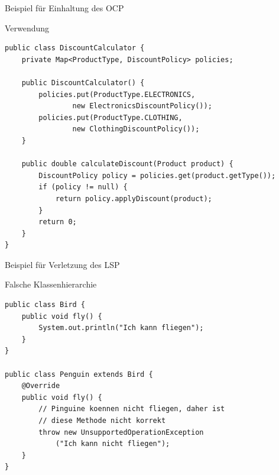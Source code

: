 \begin{frame}[fragile]{Beispiel für Einhaltung des OCP}
	\begin{exampleblock}{Verwendung}
        \begin{lstlisting}
public class DiscountCalculator {
    private Map<ProductType, DiscountPolicy> policies;

    public DiscountCalculator() {
        policies.put(ProductType.ELECTRONICS, 
                new ElectronicsDiscountPolicy());
        policies.put(ProductType.CLOTHING, 
                new ClothingDiscountPolicy());
    }

    public double calculateDiscount(Product product) {
        DiscountPolicy policy = policies.get(product.getType());
        if (policy != null) {
            return policy.applyDiscount(product);
        }
        return 0; 
    }
}
        \end{lstlisting} 		
 	\end{exampleblock}
\end{frame}


\begin{frame}[fragile]{Beispiel für Verletzung des LSP}
	\begin{alertblock}{Falsche Klassenhierarchie}
        \begin{lstlisting}
public class Bird {
    public void fly() {
        System.out.println("Ich kann fliegen");
    }
}

public class Penguin extends Bird {
    @Override
    public void fly() {
        // Pinguine koennen nicht fliegen, daher ist 
        // diese Methode nicht korrekt
        throw new UnsupportedOperationException
            ("Ich kann nicht fliegen");
    }
}
        \end{lstlisting} 		
 	\end{alertblock}
\end{frame}

